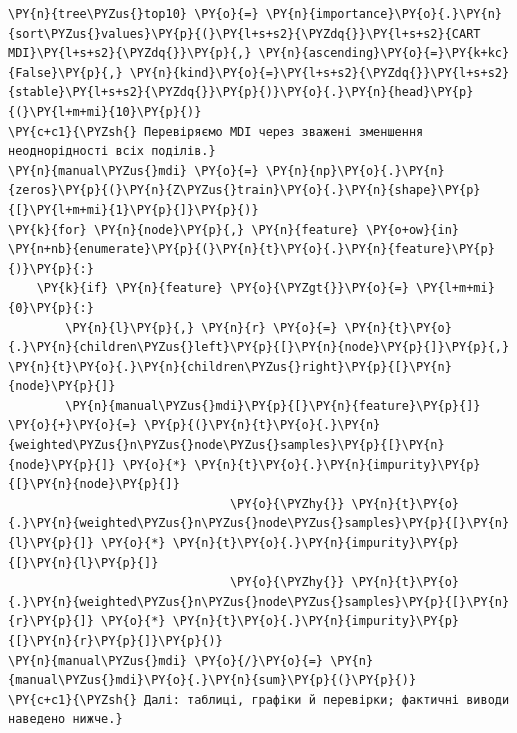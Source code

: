 \begin{Verbatim}[commandchars=\\\{\}]
\PY{n}{tree\PYZus{}top10} \PY{o}{=} \PY{n}{importance}\PY{o}{.}\PY{n}{sort\PYZus{}values}\PY{p}{(}\PY{l+s+s2}{\PYZdq{}}\PY{l+s+s2}{CART MDI}\PY{l+s+s2}{\PYZdq{}}\PY{p}{,} \PY{n}{ascending}\PY{o}{=}\PY{k+kc}{False}\PY{p}{,} \PY{n}{kind}\PY{o}{=}\PY{l+s+s2}{\PYZdq{}}\PY{l+s+s2}{stable}\PY{l+s+s2}{\PYZdq{}}\PY{p}{)}\PY{o}{.}\PY{n}{head}\PY{p}{(}\PY{l+m+mi}{10}\PY{p}{)}
\PY{c+c1}{\PYZsh{} Перевіряємо MDI через зважені зменшення неоднорідності всіх поділів.}
\PY{n}{manual\PYZus{}mdi} \PY{o}{=} \PY{n}{np}\PY{o}{.}\PY{n}{zeros}\PY{p}{(}\PY{n}{Z\PYZus{}train}\PY{o}{.}\PY{n}{shape}\PY{p}{[}\PY{l+m+mi}{1}\PY{p}{]}\PY{p}{)}
\PY{k}{for} \PY{n}{node}\PY{p}{,} \PY{n}{feature} \PY{o+ow}{in} \PY{n+nb}{enumerate}\PY{p}{(}\PY{n}{t}\PY{o}{.}\PY{n}{feature}\PY{p}{)}\PY{p}{:}
    \PY{k}{if} \PY{n}{feature} \PY{o}{\PYZgt{}}\PY{o}{=} \PY{l+m+mi}{0}\PY{p}{:}
        \PY{n}{l}\PY{p}{,} \PY{n}{r} \PY{o}{=} \PY{n}{t}\PY{o}{.}\PY{n}{children\PYZus{}left}\PY{p}{[}\PY{n}{node}\PY{p}{]}\PY{p}{,} \PY{n}{t}\PY{o}{.}\PY{n}{children\PYZus{}right}\PY{p}{[}\PY{n}{node}\PY{p}{]}
        \PY{n}{manual\PYZus{}mdi}\PY{p}{[}\PY{n}{feature}\PY{p}{]} \PY{o}{+}\PY{o}{=} \PY{p}{(}\PY{n}{t}\PY{o}{.}\PY{n}{weighted\PYZus{}n\PYZus{}node\PYZus{}samples}\PY{p}{[}\PY{n}{node}\PY{p}{]} \PY{o}{*} \PY{n}{t}\PY{o}{.}\PY{n}{impurity}\PY{p}{[}\PY{n}{node}\PY{p}{]}
                               \PY{o}{\PYZhy{}} \PY{n}{t}\PY{o}{.}\PY{n}{weighted\PYZus{}n\PYZus{}node\PYZus{}samples}\PY{p}{[}\PY{n}{l}\PY{p}{]} \PY{o}{*} \PY{n}{t}\PY{o}{.}\PY{n}{impurity}\PY{p}{[}\PY{n}{l}\PY{p}{]}
                               \PY{o}{\PYZhy{}} \PY{n}{t}\PY{o}{.}\PY{n}{weighted\PYZus{}n\PYZus{}node\PYZus{}samples}\PY{p}{[}\PY{n}{r}\PY{p}{]} \PY{o}{*} \PY{n}{t}\PY{o}{.}\PY{n}{impurity}\PY{p}{[}\PY{n}{r}\PY{p}{]}\PY{p}{)}
\PY{n}{manual\PYZus{}mdi} \PY{o}{/}\PY{o}{=} \PY{n}{manual\PYZus{}mdi}\PY{o}{.}\PY{n}{sum}\PY{p}{(}\PY{p}{)}
\PY{c+c1}{\PYZsh{} Далі: таблиці, графіки й перевірки; фактичні виводи наведено нижче.}
\end{Verbatim}
